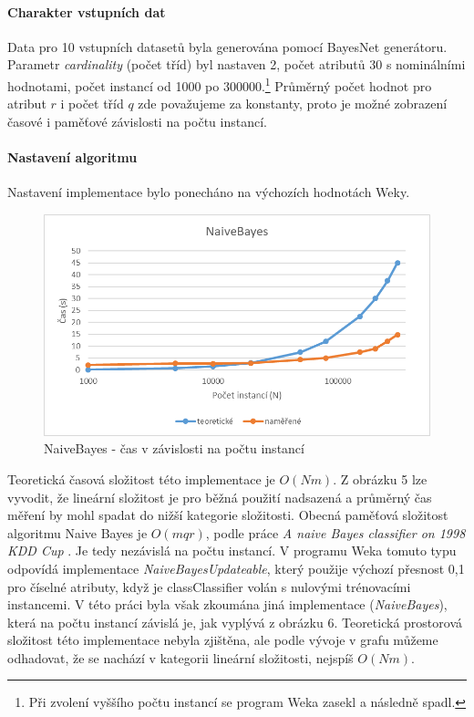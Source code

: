\documentclass[12pt]{article}
\begin{document}
\newpage
{}
\paragraph{Charakter vstupních dat}
Data pro 10 vstupních datasetů byla generována pomocí BayesNet generátoru. Parametr \textit{cardinality} (počet tříd) byl nastaven 2, počet atributů 30 s nominálními hodnotami, počet instancí od 1000 po 300000.\footnote{Při zvolení vyššího počtu instancí se program Weka zasekl a následně spadl.} Průměrný počet hodnot pro atribut $r$ i počet tříd $q$ zde považujeme za konstanty, proto je možné zobrazení časové i paměťové závislosti na počtu instancí.
\paragraph{Nastavení algoritmu}
Nastavení implementace bylo ponecháno na výchozích hodnotách Weky.
\begin{figure}[hbp]
  \centering
  \includegraphics[scale=1]{img/nb.png}
  \caption{NaiveBayes - čas v závislosti na počtu instancí}
\end{figure}
Teoretická časová složitost této implementace je $O(Nm)$. Z obrázku 5 lze vyvodit, že lineární složitost je pro běžná použití nadsazená a průměrný čas měření by mohl spadat do nižší kategorie složitosti. 
Obecná paměťová složitost algoritmu Naive Bayes je $O(mqr)$, podle práce \textit{A naive Bayes classifier on 1998 KDD Cup} \citep{chris}. Je tedy nezávislá na počtu instancí. V programu Weka tomuto typu odpovídá implementace \textit{NaiveBayesUpdateable}, který použije výchozí přesnost 0,1 pro číselné atributy, když je classClassifier volán s nulovými trénovacími instancemi. V této práci byla však zkoumána jiná implementace (\textit{NaiveBayes}), která na počtu instancí závislá je, jak vyplývá z obrázku 6. Teoretická prostorová složitost této implementace nebyla zjištěna, ale podle vývoje v grafu můžeme odhadovat, že se nachází v kategorii lineární složitosti, nejspíš $O(Nm)$.
\end{document}

